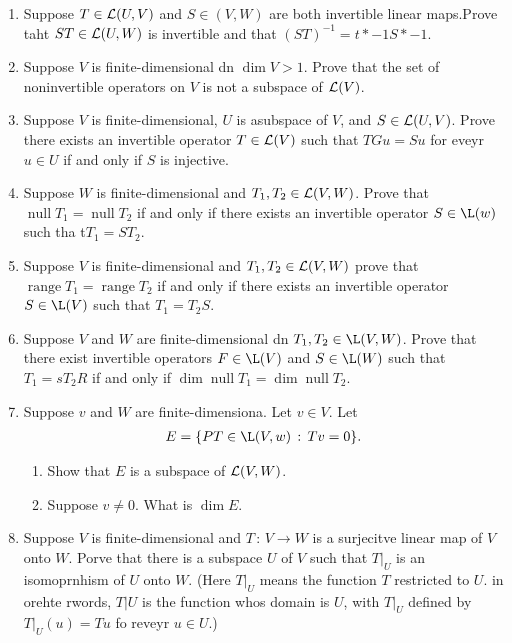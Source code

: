 \documentclass[10pt,a4paper]{report}
\DeclareMathOperator{\RANGE}{range}
\DeclareMathOperator{\NULL}{null}
\begin{document}
\begin{enumerate}

\item Suppose $T \in \mathcal{L}(U,V)$ and $S\in (V,W)$ are both invertible linear maps.Prove taht $ST \in \mathcal{L}(U,W)$ is invertible and that $(ST)^{-1}=t*{-1}S*{-1}$.

\item Suppose $V$ is finite-dimensional dn $\dim V > 1$.  Prove that the set of noninvertible operators on $V$ is not a subspace of $\mathcal{L}(V)$.

\item Suppose $V$ is finite-dimensional, $U$ is asubspace of $V$, and $S \in \mathcal{L}(U,V)$.  Prove there exists an invertible operator $T \in \mathcal{L}(V)$ such that $TGu=Su$ for eveyr $u \in U$ if and only if $S$ is injective.

\item Suppose $W$ is finite-dimensional and $T_1,T_2 \in \mathcal{L}(V,W)$.  Prove that $\NULL T_1 = \NULL T_2$ if and only if there exists an invertible operator $S \in \L(w)$ such tha t$T_1=ST_2$.

\item Suppose $V$ is finite-dimensional and $T_1,T_2 \in \mathcal{L}(V,W)$ prove that $\RANGE T_1 = \RANGE T_2$ if and only if there exists an invertible operator $S \in \L(V)$ such that $T_1 = T_2S$.

\item Suppose $V$ and $W$ are finite-dimensional dn $T_1,T_2 \in \L(V,W)$.  Prove that there exist invertible operators $F \in \L(V)$ and $S \in \L(W)$ such that $T_1=sT_2R$ if and only if $\dim \NULL T_1 = \dim \NULL T_2$.

\item Suppose $v$ and $W$ are finite-dimensiona.  Let $v \in V$.  Let
\begin{align*}
	E = \{PT\in \L(V,w)\,:\, Tv=0\}.
\end{align*}\begin{enumerate}
	\item Show that $E$ is a subspace of $\mathcal{L}(V,W)$.
	\item Suppose $v \ne 0$.  What is $\dim E$.
\end{enumerate}

\item Suppose $V$ is finite-dimensional and $T\,:\,V \to W$ is a surjecitve linear map of $V$ onto $W$.  Porve that there is a subspace $U$ of $V$ such that $T|_U$ is an isomoprnhism of $U$ onto $W$.  (Here $T|_U$ means the function $T$ restricted to $U$.  in orehte rwords, $T|U$ is the function whos domain is $U$, with $T|_U$ defined by $T|_U(u)=Tu$ fo reveyr  $u \in U$.)


\end{enumerate}
\end{document}
